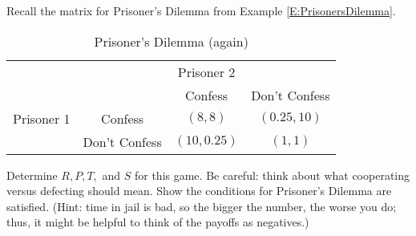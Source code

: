 \begin{xca}\label{E:PDshow}
Recall the matrix for Prisoner's Dilemma from Example \ref{E:PrisonersDilemma}.


\begin{table}[h]
\centering

\begin{tabular}{cccc}
                      & \multicolumn{3}{c}{Prisoner 2}                                                  \\ \cline{2-4} 
\multicolumn{1}{l|}{} & \multicolumn{1}{l|}{} & \multicolumn{1}{c|}{Confess} & \multicolumn{1}{c|}{Don't Confess} \\ \cline{2-4} 
\multicolumn{1}{l|}{Prisoner 1} & \multicolumn{1}{c|}{Confess} & \multicolumn{1}{c|}{$(8, 8)$} & \multicolumn{1}{c|}{$(0.25, 10)$} \\ \cline{2-4} 
\multicolumn{1}{l|}{} & \multicolumn{1}{c|}{Don't Confess} & \multicolumn{1}{c|}{$(10, 0.25)$} & \multicolumn{1}{c|}{$(1, 1)$} \\ \cline{2-4} 
\end{tabular}
\caption{Prisoner's Dilemma (again)}
\end{table}



Determine $R, P, T,$ and $S$ for this game. Be careful: think about what cooperating versus defecting should mean. Show the conditions for Prisoner's Dilemma are satisfied. (Hint: time in jail is bad, so the bigger the number, the worse you do; thus, it might be helpful to think of the payoffs as negatives.)
\end{xca}

